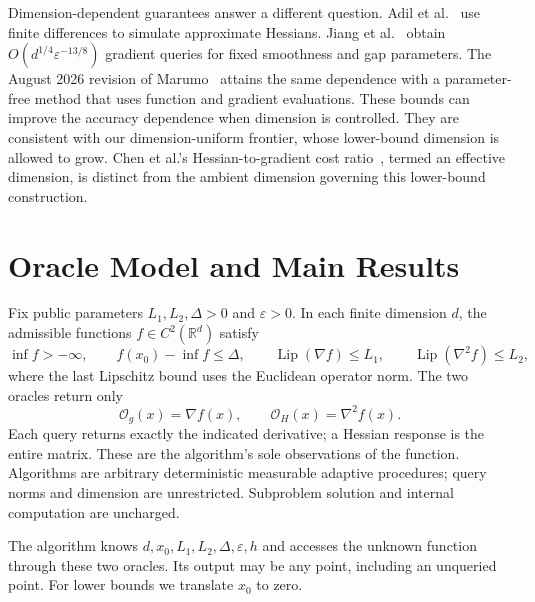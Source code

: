 \documentclass[11pt]{article}
\theoremstyle{remark}
\theoremstyle{remark}
\newcommand{\R}{\mathbb R}
\newcommand{\eps}{\varepsilon}
\newcommand{\Lip}{\operatorname{Lip}}
\begin{document}
Dimension-dependent guarantees answer a different question.
Adil et al.~\cite{adil} use finite differences to simulate approximate
Hessians. Jiang et al.~\cite{jiang} obtain
$O(d^{1/4}\eps^{-13/8})$ gradient queries for fixed smoothness and gap
parameters. The August 2026 revision of Marumo~\cite{marumo} attains the
same dependence with a parameter-free method that uses function and
gradient evaluations. These bounds can improve the accuracy dependence
when dimension is controlled. They are consistent with our
dimension-uniform frontier, whose lower-bound dimension is allowed to
grow. Chen et al.'s Hessian-to-gradient cost ratio~\cite{chen}, termed an
effective dimension, is distinct from the ambient dimension governing
this lower-bound construction.

\section{Oracle Model and Main Results}\label{sec:model}
Fix public parameters $L_1,L_2,\Delta>0$ and $\eps>0$. In each finite dimension $d$, the admissible functions $f\in C^2(\R^d)$ satisfy
\begin{equation}\label{eq:class}
 \inf f> -\infty,\qquad f(x_0)-\inf f\le\Delta,\qquad
 \Lip(\nabla f)\le L_1,\qquad \Lip(\nabla^2 f)\le L_2,
\end{equation}
where the last Lipschitz bound uses the Euclidean operator norm. The two oracles return only
\[
 \mathcal O_g(x)=\nabla f(x),\qquad \mathcal O_H(x)=\nabla^2f(x).
\]
Each query returns exactly the indicated derivative; a Hessian response is the entire matrix. These are the algorithm's sole observations of the function. Algorithms are arbitrary deterministic measurable adaptive procedures; query norms and dimension are unrestricted. Subproblem solution and internal computation are uncharged.

The algorithm knows $d,x_0,L_1,L_2,\Delta,\eps,h$ and accesses the unknown function through these two oracles. Its output may be any point, including an unqueried point. For lower bounds we translate $x_0$ to zero.
\end{document}
